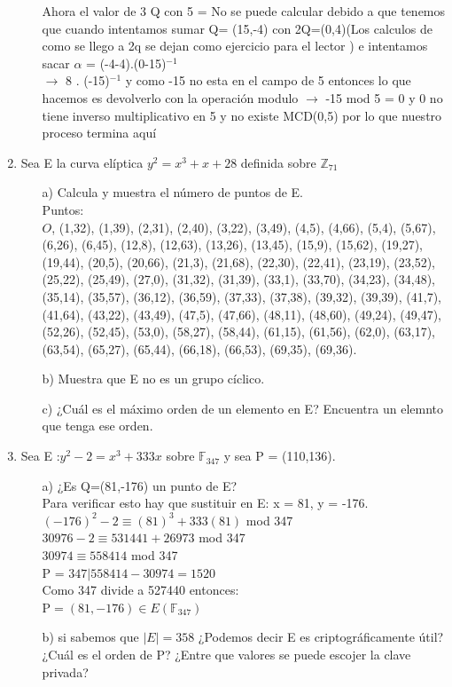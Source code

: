 \documentclass[11pt,letterpaper]{article}
\begin{document}
\begin{enumerate}
\begin{itemize}
Ahora el valor de 3 Q con 5 =  No se puede calcular debido a que tenemos que cuando intentamos sumar Q= (15,-4) con 2Q=(0,4)(Los calculos de como se llego a 2q  se dejan como ejercicio para el lector ) e intentamos sacar $\alpha$ = (-4-4).(0-15)$^{-1}$\\
$\rightarrow$ 8 . (-15)$^{-1}$ y como -15 no esta en el campo de 5 entonces lo que hacemos es devolverlo con la operación modulo $\rightarrow$ -15 mod 5 = 0 y 0 no tiene inverso multiplicativo en 5 y no existe MCD(0,5) por lo que nuestro proceso termina aquí

\end{itemize}
\item Sea E la curva elíptica $y^{2} =x^{3}+x+28 $ definida sobre $\mathbb{Z}_{71}$
\begin{itemize}
\item[a)] Calcula y muestra el número de puntos de E.\\
Puntos:\\ $O$, (1,32),
(1,39),
(2,31),
(2,40),
(3,22),
(3,49),
(4,5),
(4,66),
(5,4),
(5,67),
(6,26),
(6,45),
(12,8),
(12,63),
(13,26),
(13,45),
(15,9),
(15,62),
(19,27),
(19,44),
(20,5),
(20,66),
(21,3),
(21,68),
(22,30),
(22,41),
(23,19),
(23,52),
(25,22),
(25,49),
(27,0),
(31,32),
(31,39),
(33,1),
(33,70),
(34,23),
(34,48),
(35,14),
(35,57),
(36,12),
(36,59),
(37,33),
(37,38),
(39,32),
(39,39),
(41,7),
(41,64),
(43,22),
(43,49),
(47,5),
(47,66),
(48,11),
(48,60),
(49,24),
(49,47),
(52,26),
(52,45),
(53,0),
(58,27),
(58,44),
(61,15),
(61,56),
(62,0),
(63,17),
(63,54),
(65,27),
(65,44),
(66,18),
(66,53),
(69,35),
(69,36).

\item[b)] Muestra que E no es un grupo cíclico.
\item[c)] ¿Cuál es el máximo orden de un elemento en E? Encuentra un elemnto que tenga ese orden.
\end{itemize}
\item Sea E :$y^{2}-2=x^{3}+333x$ sobre $\mathbb{F}_{347}$ y sea P = (110,136).
\begin{itemize}
\item[a)] ¿Es Q=(81,-176) un punto de E?\\
Para verificar esto hay que sustituir en E: x = 81, y = -176.\\
$(-176)^2 -2 \equiv (81)^3 +333(81)$ mod 347\\
$30976-2 \equiv 531441+26973$ mod 347\\
$30974 \equiv 558414$ mod 347\\
P = $347 | 558414 -30974 = 1520$\\
Como 347 divide a 527440 entonces:\\
P$=(81,-176) \in E(\mathbb{F}_347)$
\item[b)] si sabemos que $|E| = 358$ ¿Podemos decir E es criptográficamente útil?
¿Cuál es el orden de P? ¿Entre que valores se puede escojer la clave privada?






\end{itemize}
\end{enumerate}
\end{document}
